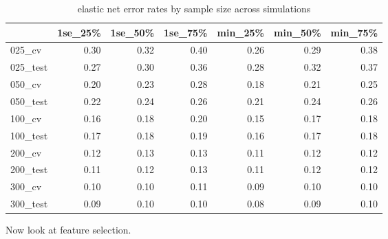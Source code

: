 \documentclass[
]{book}
\begin{document}
\begin{table}

\caption{\label{tab:print-enet-simRes-errors-overSim}elastic net error rates by sample size across simulations}
\centering
\begin{tabular}[t]{l|r|r|r|r|r|r}
\hline
  & 1se\_25\% & 1se\_50\% & 1se\_75\% & min\_25\% & min\_50\% & min\_75\%\\
\hline
025\_cv & 0.30 & 0.32 & 0.40 & 0.26 & 0.29 & 0.38\\
\hline
025\_test & 0.27 & 0.30 & 0.36 & 0.28 & 0.32 & 0.37\\
\hline
050\_cv & 0.20 & 0.23 & 0.28 & 0.18 & 0.21 & 0.25\\
\hline
050\_test & 0.22 & 0.24 & 0.26 & 0.21 & 0.24 & 0.26\\
\hline
100\_cv & 0.16 & 0.18 & 0.20 & 0.15 & 0.17 & 0.18\\
\hline
100\_test & 0.17 & 0.18 & 0.19 & 0.16 & 0.17 & 0.18\\
\hline
200\_cv & 0.12 & 0.13 & 0.13 & 0.11 & 0.12 & 0.12\\
\hline
200\_test & 0.11 & 0.12 & 0.13 & 0.11 & 0.12 & 0.12\\
\hline
300\_cv & 0.10 & 0.10 & 0.11 & 0.09 & 0.10 & 0.10\\
\hline
300\_test & 0.09 & 0.10 & 0.10 & 0.08 & 0.09 & 0.10\\
\hline
\end{tabular}
\end{table}

Now look at feature selection.
\end{document}
